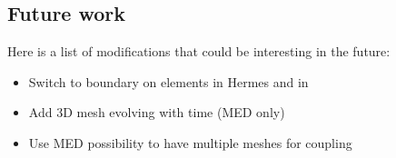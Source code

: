%
\subsection{Future work}
%
Here is a list of modifications that could be interesting in the future:
\begin{itemize}
\item Switch to boundary on elements in Hermes and in \telemacsystem
\item Add 3D mesh evolving with time (MED only)
\item Use MED possibility to have multiple meshes for coupling
\end{itemize}
